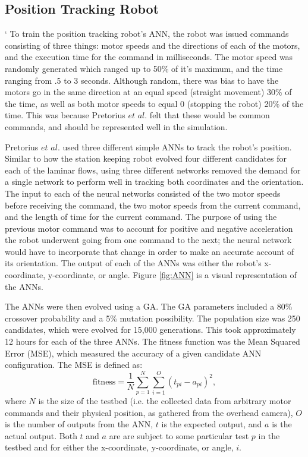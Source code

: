 \documentclass{sig-alternate}
\begin{document}
  \subsection{Position Tracking Robot}\label{Pretorius Evolving}`
  To train the position tracking robot's ANN, the robot was issued commands ~\cite{Pretorius:2009:TAN:1632149.1632171}  consisting of three things: motor speeds and the directions of each of the motors, and the execution time for the command in milliseconds. The motor speed was randomly generated which ranged up to 50\% of it's maximum, and the time ranging from .5 to 3 seconds. Although random, there was bias to have the motors go in the same direction at an equal speed (straight movement) 30\% of the time, as well as both motor speeds to equal 0 (stopping the robot) 20\% of the time. This was because  Pretorius $et$ $al.$ felt that these would be common commands, and should be represented well in the simulation.
  
  Pretorius $et$ $al.$ used three different simple ANNs to track the robot's position. Similar to how the station keeping robot evolved four different candidates for each of the laminar flows, using three different networks removed the demand for a single network to perform well in tracking both coordinates and the orientation. The input to each of the neural networks consisted of the two motor speeds before receiving the command, the two motor speeds from the current command, and the length of time for the current command. The purpose of using the previous motor command was to account for positive and negative acceleration the robot underwent going from one command to the next; the neural network would have to incorporate that change in order to make an accurate account of its orientation. The output of each of the ANNs was either the robot's x-coordinate, y-coordinate, or angle. Figure \ref{fig:ANN} is a visual representation of the ANNs.
 

  The ANNs were then evolved using a GA. The GA parameters included a 80\% crossover probability and a 5\% mutation possibility. The population size was 250 candidates, which were evolved for 15,000 generations. This took approximately 12 hours for each of the three ANNs. The fitness function was the Mean Squared Error (MSE), which measured the accuracy of a given candidate ANN configuration. The MSE is defined as:
  \[
  \textrm{fitness} = \frac{1}{N}\sum\limits_{p=1}^N\sum\limits_{i=1}^O (t_{pi} - a_{pi})^2,
\] 
where $N$ is the size of the testbed (i.e. the collected data from arbitrary motor commands and their physical position, as gathered from the overhead camera), $O$ is the number of outputs from the ANN, $t$ is the expected output, and $a$ is the actual output. Both $t$ and $a$ are are subject to some particular test $p$ in the testbed and for either the x-coordinate, y-coordinate, or angle, $i$.
  
\end{document}
